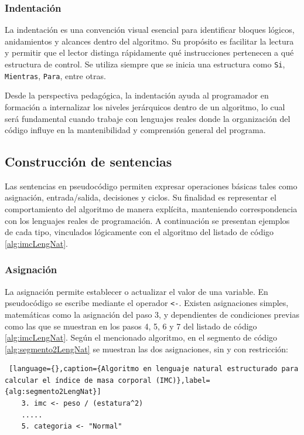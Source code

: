 \documentclass[12pt,twoside]{book}
\begin{document}
					\subsubsection{Indentación}
						\noindent
						La indentación es una convención visual esencial para identificar bloques lógicos, anidamientos y alcances dentro del algoritmo. Su propósito es facilitar la lectura y permitir que el lector distinga rápidamente qué instrucciones pertenecen a qué estructura de control. Se utiliza siempre que se inicia una estructura como \texttt{Si}, \texttt{Mientras}, \texttt{Para}, entre otras.
						
						Desde la perspectiva pedagógica, la indentación ayuda al programador en formación a internalizar los niveles jerárquicos dentro de un algoritmo, lo cual será fundamental cuando trabaje con lenguajes reales donde la organización del código influye en la mantenibilidad y comprensión general del programa.
				
				\subsection{Construcción de sentencias}
					\noindent
					Las sentencias en pseudocódigo permiten expresar operaciones básicas tales como asignación, entrada/salida, decisiones y ciclos. Su finalidad es representar el comportamiento del algoritmo de manera explícita, manteniendo correspondencia con los lenguajes reales de programación. A continuación se presentan ejemplos de cada tipo, vinculados lógicamente con el algoritmo del listado de código \ref{alg:imcLengNat}.
					
					\subsubsection{Asignación}
						\noindent
						La asignación permite establecer o actualizar el valor de una variable. En pseudocódigo se escribe mediante el operador \texttt{<-}. Existen asignaciones simples, matemáticas como la asignación del paso 3, y dependientes de condiciones previas como las que se muestran en los pasos 4, 5, 6 y 7 del listado de código \ref{alg:imcLengNat}. Según el mencionado algoritmo, en el segmento de código \ref{alg:segmento2LengNat} se muestran las dos asignaciones, sin y con restricción:
						
						\begin{lstlisting} [language={},caption={Algoritmo en lenguaje natural estructurado para calcular el índice de masa corporal (IMC)},label={alg:segmento2LengNat}]
	3. imc <- peso / (estatura^2)
	.....
	5. categoria <- "Normal" \end{lstlisting}
				
\end{document}
